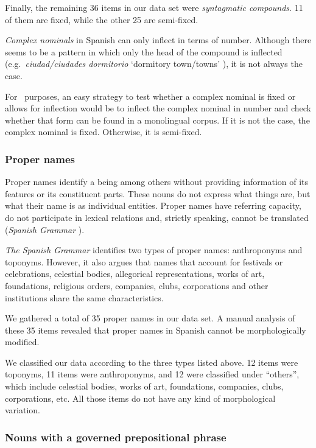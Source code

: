 \documentclass[output=paper]{langsci/langscibook}
\begin{document}
Finally, the remaining 36 items in our data set were \textit{syntagmatic compounds}.
11 of them are fixed, while the other 25 are semi-fixed. 

\textit{Complex nominals} in Spanish can only inflect in terms of number.
Although there seems to be a pattern in which only the head of the compound is inflected (e.g.\  \textit{ciudad/ciudades dormitorio} `dormitory town/towns' ), it is not always the case.

For \nlp\ purposes, an easy strategy to test whether a complex nominal is fixed or allows for inflection would be to inflect the complex nominal in number and check whether that form can be found in a monolingual corpus.
If it is not the case, the complex nominal is fixed.
Otherwise, it is semi-fixed.

\subsubsection{Proper names}
\label{ssssec:properNames}

Proper names identify a being among others without providing information of its features or its constituent parts.
These nouns do not express what things are, but what their name is as individual entities.
Proper names have referring capacity, do not participate in lexical relations and, strictly speaking, cannot be translated (\textit{Spanish Grammar} \citeyear[209--210]{RAE:2010}).

\textit{The Spanish Grammar} \citeyearpar[219]{RAE:2010} identifies two types of proper names: anthroponyms and toponyms.
However, it also argues that names that account for festivals or celebrations, celestial bodies, allegorical representations, works of art, foundations, religious orders, companies, clubs, corporations and other institutions share the same characteristics.

We gathered a total of 35 proper names in our data set.
A manual analysis of these 35 items revealed that proper names in Spanish cannot be morphologically modified.

We classified our data according to the three types listed above.
12 items were toponyms, 11 items were anthroponyms, and 12 were classified under ``others'', which include celestial bodies, works of art, foundations, companies, clubs, corporations, etc.
All those items do not have any kind of morphological variation.

\subsubsection{Nouns with a governed prepositional phrase}
\label{ssssec:nouns_with_PP}
\end{document}
